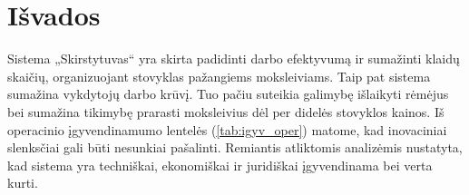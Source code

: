 \chapter{Išvados}

Sistema „Skirstytuvas“ yra skirta padidinti darbo efektyvumą ir sumažinti 
klaidų skaičių, organizuojant stovyklas pažangiems moksleiviams. Taip pat 
sistema sumažina vykdytojų darbo krūvį. Tuo pačiu suteikia galimybę 
išlaikyti rėmėjus bei sumažina tikimybę prarasti moksleivius dėl per
didelės stovyklos kainos. Iš operacinio įgyvendinamumo lentelės 
(\ref{tab:igyv_oper})
matome, kad inovaciniai slenksčiai gali būti nesunkiai pašalinti.
Remiantis atliktomis analizėmis nustatyta, kad sistema yra techniškai, 
ekonomiškai ir juridiškai įgyvendinama bei verta kurti.

